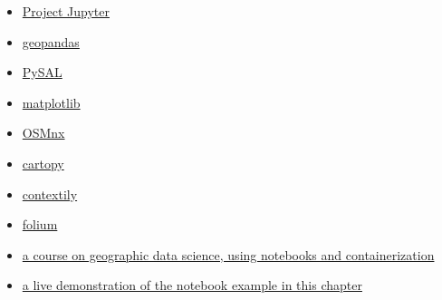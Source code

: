 \documentclass[11pt,letterpaper]{article}
\begin{document}
\begin{itemize}
    \item \href{https://jupyter.org/}{Project Jupyter}
    \item \href{https://geopandas.org/}{geopandas}
    \item \href{https://pysal.org/}{PySAL}
    \item \href{https://matplotlib.org/}{matplotlib}
    \item \href{https://osmnx.readthedocs.io/}{OSMnx}
    \item \href{https://scitools.org.uk/cartopy/docs/latest/}{cartopy}
    \item \href{https://contextily.readthedocs.io/}{contextily}
    \item \href{https://python-visualization.github.io/folium/}{folium}
    \item \href{https://darribas.org/gds_course}{a course on geographic data science, using notebooks and containerization}
    \item \href{https://github.com/darribas/bok_chapter_notebooks}{a live demonstration of the notebook example in this chapter}
\end{itemize}
\end{document}
